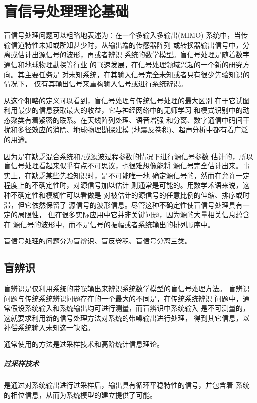 ﻿%

\chapter{盲信号处理理论基础}
\label{chap01}


盲信号处理问题可以粗略地表述为：在一个多输入多输出(MIMO)
系统中，当传输信道特性未知或所知甚少时，从输出端的传感器阵列
或转换器输出信号中，分离或估计出源信号的波形，再或者辨识
系统的数学模型。盲信号处理是随着数字通信和地球物理勘探等行业
的飞速发展，在信号处理领域兴起的一个新的研究方向。其主要任务是
对未知系统，在其输入信号完全未知或者只有很少先验知识的情况下，
仅有其输出信号来重构输入信号或进行系统辨识。

从这个粗略的定义可以看到，盲信号处理与传统信号处理的最大区别
在于它试图利用最少的信息获取最大的收益，它与神经网络中的无师学习
和模式识别中的动态聚类有着紧密的联系。在天线阵列处理、语音增强
和分离、数字通信中码间干扰和多径效应的消除、地球物理勘探建模
(地震反卷积)、超声分析中都有着广泛的用途。

因为是在缺乏混合系统和/或滤波过程参数的情况下进行源信号参数
估计的，所以盲信号处理看起来似乎有点不可思议，也很难想像能将
源信号完全估计出来。事实上，在缺乏某些先验知识时，是不可能唯一地
确定源信号的，然而在允许一定程度上的不确定性时，对源信号加以估计
则通常是可能的。用数学术语来说，这种不确定性和模糊性可以看做是
对被估计的源信号的任意比例的伸缩、排序或时滞，但它依然保留了
源信号的波形信息。尽管这种不确定性使盲信号处理具有一定的局限性，
但在很多实际应用中它并非关键问题，因为源的大量相关信息蕴含在
源信号的波形中，而不是信号的振幅或者系统输出的排列顺序中。

盲信号处理的问题分为盲辨识、盲反卷积、盲信号分离三类。

\section{盲辨识}
盲辨识是仅利用系统的带噪输出来辨识系统数学模型的盲信号处理方法。
盲辨识问题与传统系统辨识问题存在的一个最大的不同是，在传统系统辨识
问题中，通常假设系统输入和系统输出均可进行测量，而盲辨识中系统输入
是不可测量的，这就要求利用新的信号处理方法对系统的带噪输出进行处理，
得到其它信息，以补偿系统输入未知这一缺陷。

通常使用的方法是过采样技术和高阶统计信息理论。
\paragraph*{过采样技术}
是通过对系统输出进行过采样后，输出具有循环平稳特性的信号，并包含着
系统的相位信息，从而为系统模型的建立提供了可能。


